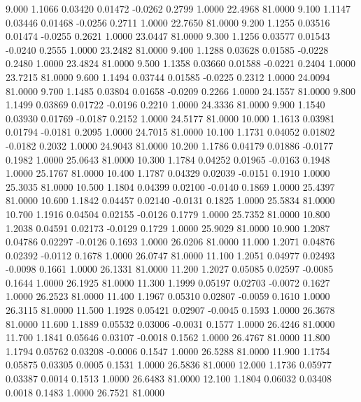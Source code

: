    9.000   1.1066   0.03420   0.01472  -0.0262   0.2799   1.0000  22.4968  81.0000
   9.100   1.1147   0.03446   0.01468  -0.0256   0.2711   1.0000  22.7650  81.0000
   9.200   1.1255   0.03516   0.01474  -0.0255   0.2621   1.0000  23.0447  81.0000
   9.300   1.1256   0.03577   0.01543  -0.0240   0.2555   1.0000  23.2482  81.0000
   9.400   1.1288   0.03628   0.01585  -0.0228   0.2480   1.0000  23.4824  81.0000
   9.500   1.1358   0.03660   0.01588  -0.0221   0.2404   1.0000  23.7215  81.0000
   9.600   1.1494   0.03744   0.01585  -0.0225   0.2312   1.0000  24.0094  81.0000
   9.700   1.1485   0.03804   0.01658  -0.0209   0.2266   1.0000  24.1557  81.0000
   9.800   1.1499   0.03869   0.01722  -0.0196   0.2210   1.0000  24.3336  81.0000
   9.900   1.1540   0.03930   0.01769  -0.0187   0.2152   1.0000  24.5177  81.0000
  10.000   1.1613   0.03981   0.01794  -0.0181   0.2095   1.0000  24.7015  81.0000
  10.100   1.1731   0.04052   0.01802  -0.0182   0.2032   1.0000  24.9043  81.0000
  10.200   1.1786   0.04179   0.01886  -0.0177   0.1982   1.0000  25.0643  81.0000
  10.300   1.1784   0.04252   0.01965  -0.0163   0.1948   1.0000  25.1767  81.0000
  10.400   1.1787   0.04329   0.02039  -0.0151   0.1910   1.0000  25.3035  81.0000
  10.500   1.1804   0.04399   0.02100  -0.0140   0.1869   1.0000  25.4397  81.0000
  10.600   1.1842   0.04457   0.02140  -0.0131   0.1825   1.0000  25.5834  81.0000
  10.700   1.1916   0.04504   0.02155  -0.0126   0.1779   1.0000  25.7352  81.0000
  10.800   1.2038   0.04591   0.02173  -0.0129   0.1729   1.0000  25.9029  81.0000
  10.900   1.2087   0.04786   0.02297  -0.0126   0.1693   1.0000  26.0206  81.0000
  11.000   1.2071   0.04876   0.02392  -0.0112   0.1678   1.0000  26.0747  81.0000
  11.100   1.2051   0.04977   0.02493  -0.0098   0.1661   1.0000  26.1331  81.0000
  11.200   1.2027   0.05085   0.02597  -0.0085   0.1644   1.0000  26.1925  81.0000
  11.300   1.1999   0.05197   0.02703  -0.0072   0.1627   1.0000  26.2523  81.0000
  11.400   1.1967   0.05310   0.02807  -0.0059   0.1610   1.0000  26.3115  81.0000
  11.500   1.1928   0.05421   0.02907  -0.0045   0.1593   1.0000  26.3678  81.0000
  11.600   1.1889   0.05532   0.03006  -0.0031   0.1577   1.0000  26.4246  81.0000
  11.700   1.1841   0.05646   0.03107  -0.0018   0.1562   1.0000  26.4767  81.0000
  11.800   1.1794   0.05762   0.03208  -0.0006   0.1547   1.0000  26.5288  81.0000
  11.900   1.1754   0.05875   0.03305   0.0005   0.1531   1.0000  26.5836  81.0000
  12.000   1.1736   0.05977   0.03387   0.0014   0.1513   1.0000  26.6483  81.0000
  12.100   1.1804   0.06032   0.03408   0.0018   0.1483   1.0000  26.7521  81.0000

